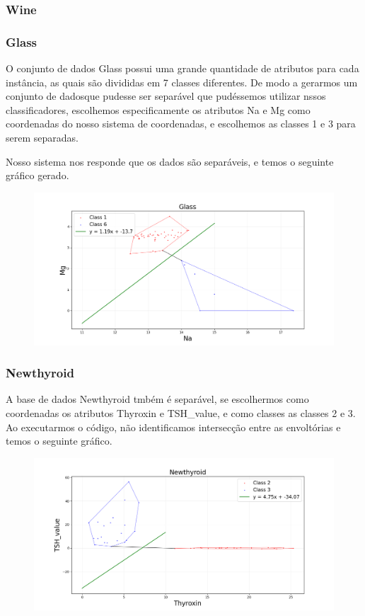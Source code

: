 \documentclass{article}
\begin{document}
\subsubsection{Wine}

\subsubsection{Glass}

O conjunto de dados Glass possui uma grande quantidade de atributos para cada instância, as quais são divididas em 7 classes diferentes. De modo a gerarmos um conjunto de dadosque pudesse ser separável que pudéssemos utilizar nssos classificadores, escolhemos especificamente os atributos Na e Mg como coordenadas do nosso sistema de coordenadas, e escolhemos as classes 1 e 3 para serem separadas.

Nosso sistema nos responde que os dados são separáveis, e temos o seguinte gráfico gerado.

\begin{figure} [H]
	\includegraphics[width=12cm]{glass.png}
	\centering
\end{figure}


\subsubsection{Newthyroid}

A base de dados Newthyroid tmbém é separável, se escolhermos como coordenadas os atributos Thyroxin e TSH\_value, e como classes as classes 2 e 3. Ao executarmos o código, não identificamos intersecção entre as envoltórias e temos o seguinte gráfico.

\begin{figure} [H]
	\includegraphics[width=12cm]{newthyroid.png}
	\centering
\end{figure}
\end{document}
